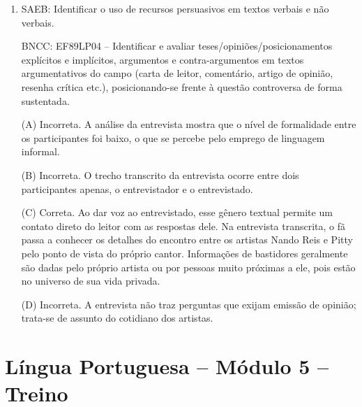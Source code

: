 \begin{enumerate}
(D) Incorreta. O narrador, no discurso indireto livre, reproduz as vozes
do menino e da galinha tal como são ditas ou pensadas, embora não
estejam marcadas graficamente como discurso direto.

\item
SAEB: Identificar o uso de recursos persuasivos em textos verbais e não
verbais. 

BNCC: EF89LP04 -- Identificar e avaliar
teses/opiniões/posicionamentos explícitos e implícitos, argumentos e
contra-argumentos em textos argumentativos do campo (carta de leitor,
comentário, artigo de opinião, resenha crítica etc.), posicionando-se
frente à questão controversa de forma sustentada.

(A) Incorreta. A análise da entrevista mostra que o nível de formalidade
entre os participantes foi baixo, o que se percebe pelo emprego de
linguagem informal.

(B) Incorreta. O trecho transcrito da entrevista ocorre entre dois
participantes apenas, o entrevistador e o entrevistado.

(C) Correta. Ao dar voz ao entrevistado, esse gênero textual permite um
contato direto do leitor com as respostas dele. Na entrevista
transcrita, o fã passa a conhecer os detalhes do encontro entre os
artistas Nando Reis e Pitty pelo ponto de vista do próprio cantor.
Informações de bastidores geralmente são dadas pelo próprio artista ou
por pessoas muito próximas a ele, pois estão no universo de sua vida
privada.

(D) Incorreta. A entrevista não traz perguntas que exijam emissão de
opinião; trata-se de assunto do cotidiano dos artistas.
\end{enumerate}

\section*{Língua Portuguesa – Módulo 5 – Treino}

